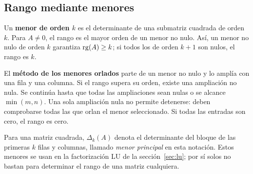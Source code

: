 \subsection*{Rango mediante menores}

Un \textbf{menor de orden $k$} es el determinante de una submatriz cuadrada
de orden $k$. Para $A\ne0$, el rango es el mayor orden de un menor no nulo.
Así, un menor no nulo de orden $k$ garantiza $\operatorname{rg}(A)\ge k$; si todos los
de orden $k+1$ son nulos, el rango es $k$.

El \textbf{método de los menores orlados} parte de un menor no nulo
y lo amplía con una fila y una columna. Si el rango supera su orden,
existe una ampliación no nula. Se continúa hasta que todas las
ampliaciones sean nulas o se alcance $\min(m,n)$. Una sola ampliación
nula no permite detenerse: deben comprobarse todas las que orlan
el menor seleccionado. Si todas las entradas son cero, el rango es cero.

Para una matriz cuadrada, $\Delta_k(A)$ denota el determinante del bloque
de las primeras $k$ filas y columnas, llamado \emph{menor principal}
en esta notación. Estos menores se usan en la factorización LU
de la sección~\ref{sec:lu}; por sí solos no bastan para determinar
el rango de una matriz cualquiera.
